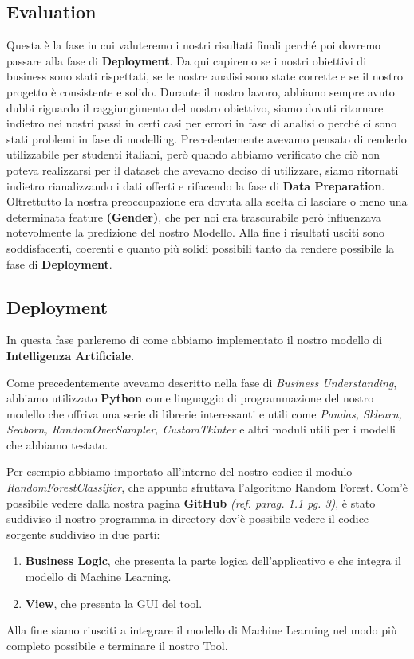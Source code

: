 \documentclass[12pt]{article}
\begin{document}
\subsection{Evaluation}
Questa è la fase in cui valuteremo i nostri risultati finali perché poi dovremo passare alla fase di \textbf{Deployment}. Da qui capiremo se i nostri obiettivi di business sono stati rispettati, se le nostre analisi sono state corrette e se il nostro progetto è consistente e solido.
Durante il nostro lavoro, abbiamo sempre avuto dubbi riguardo il raggiungimento del nostro obiettivo, siamo dovuti ritornare indietro nei nostri passi in certi casi per errori in fase di analisi o perché ci sono stati problemi in fase di modelling.
Precedentemente avevamo pensato di renderlo utilizzabile per studenti italiani, però quando abbiamo verificato che ciò non poteva realizzarsi per il dataset che avevamo deciso di utilizzare, siamo ritornati indietro rianalizzando i dati offerti e rifacendo la fase di \textbf{Data Preparation}.
Oltrettutto la nostra preoccupazione era dovuta alla scelta di lasciare o meno una determinata feature \textbf{(Gender)}, che per noi era trascurabile però influenzava notevolmente la predizione del nostro Modello. Alla fine i risultati usciti sono soddisfacenti, coerenti e quanto più solidi possibili tanto da rendere possibile la fase di \textbf{Deployment}.
\subsection{Deployment}
In questa fase parleremo di come abbiamo implementato il nostro modello di \textbf{Intelligenza Artificiale}.
\par
Come precedentemente avevamo descritto nella fase di \textit{Business Understanding}, abbiamo utilizzato \textbf{Python} come linguaggio di programmazione del nostro modello che offriva una serie di librerie interessanti e utili come \textit{Pandas, Sklearn, Seaborn, RandomOverSampler, CustomTkinter} e altri moduli utili per i modelli che abbiamo testato.
\par
Per esempio abbiamo importato all'interno del nostro codice il modulo \textit{RandomForestClassifier}, che appunto sfruttava l'algoritmo Random Forest.
Com'è possibile vedere dalla nostra pagina \textbf{GitHub} \textit{(ref. parag. 1.1 pg. 3)}, è stato  suddiviso il nostro programma in directory dov'è possibile vedere il codice sorgente suddiviso in due parti:
\begin{enumerate}
    \item \textbf{Business Logic}, che presenta la parte logica dell'applicativo e che integra il modello di Machine Learning.
    \item \textbf{View}, che presenta la GUI del tool.
\end{enumerate}
Alla fine siamo riusciti a integrare il modello di Machine Learning nel modo più completo possibile e terminare il nostro Tool.
\end{document}
